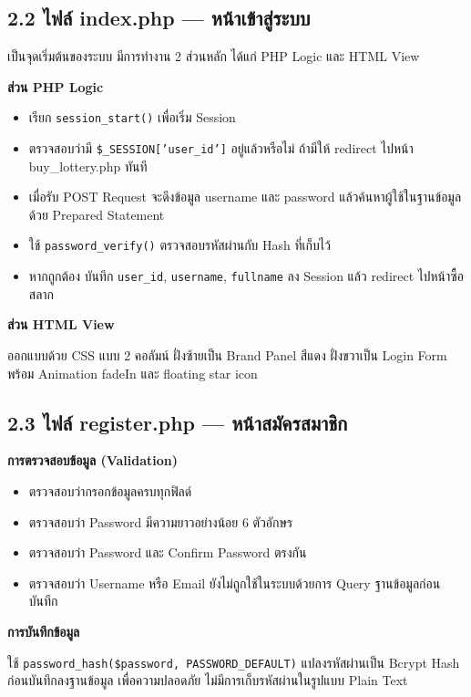 \documentclass[a4paper,12pt]{article}
\begin{document}
\subsection*{2.2 ไฟล์ index.php --- หน้าเข้าสู่ระบบ}

เป็นจุดเริ่มต้นของระบบ มีการทำงาน 2 ส่วนหลัก ได้แก่ PHP Logic และ HTML View

\noindent\textbf{ส่วน PHP Logic}
\begin{itemize}[leftmargin=1.5cm, topsep=2pt, itemsep=1pt]
  \item เรียก \texttt{session\_start()} เพื่อเริ่ม Session
  \item ตรวจสอบว่ามี \texttt{\$\_SESSION['user\_id']} อยู่แล้วหรือไม่ ถ้ามีให้ redirect ไปหน้า buy\_lottery.php ทันที
  \item เมื่อรับ POST Request จะดึงข้อมูล username และ password แล้วค้นหาผู้ใช้ในฐานข้อมูลด้วย Prepared Statement
  \item ใช้ \texttt{password\_verify()} ตรวจสอบรหัสผ่านกับ Hash ที่เก็บไว้
  \item หากถูกต้อง บันทึก \texttt{user\_id}, \texttt{username}, \texttt{fullname} ลง Session แล้ว redirect ไปหน้าซื้อสลาก
\end{itemize}

\noindent\textbf{ส่วน HTML View}

ออกแบบด้วย CSS แบบ 2 คอลัมน์ ฝั่งซ้ายเป็น Brand Panel สีแดง ฝั่งขวาเป็น Login Form พร้อม Animation fadeIn และ floating star icon

\subsection*{2.3 ไฟล์ register.php --- หน้าสมัครสมาชิก}

\noindent\textbf{การตรวจสอบข้อมูล (Validation)}
\begin{itemize}[leftmargin=1.5cm, topsep=2pt, itemsep=1pt]
  \item ตรวจสอบว่ากรอกข้อมูลครบทุกฟิลด์
  \item ตรวจสอบว่า Password มีความยาวอย่างน้อย 6 ตัวอักษร
  \item ตรวจสอบว่า Password และ Confirm Password ตรงกัน
  \item ตรวจสอบว่า Username หรือ Email ยังไม่ถูกใช้ในระบบด้วยการ Query ฐานข้อมูลก่อนบันทึก
\end{itemize}

\noindent\textbf{การบันทึกข้อมูล}

ใช้ \texttt{password\_hash(\$password, PASSWORD\_DEFAULT)} แปลงรหัสผ่านเป็น Bcrypt Hash ก่อนบันทึกลงฐานข้อมูล เพื่อความปลอดภัย ไม่มีการเก็บรหัสผ่านในรูปแบบ Plain Text
\end{document}
